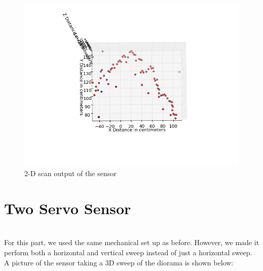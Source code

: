 \documentclass{article}
\begin{document}
\begin{figure}[h!]
\begin{center}
\includegraphics[scale=0.6]{2d_scan.png}
\caption{2-D scan output of the sensor}
\end{center}
\end{figure}

\section{Two Servo Sensor} \ \\
%
For this part, we used the same mechanical set up as before. However, we made it perform both a horizontal and vertical sweep instead of just a horizontal sweep. A picture of the sensor taking a 3D sweep of the diorama is shown below:
\end{document}
